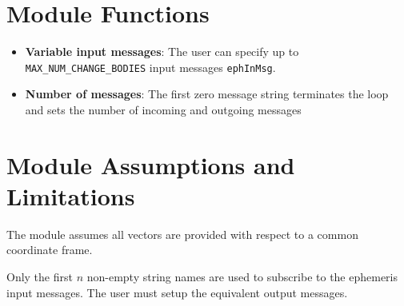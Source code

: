 

\section{Module Functions}
\begin{itemize}
	\item \textbf{Variable input messages}: The user can specify up to {\tt MAX\_NUM\_CHANGE\_BODIES} input messages {\tt ephInMsg}.
	\item \textbf{Number of messages}: The first zero message string terminates the loop and sets the number of incoming and outgoing messages
\end{itemize}

\section{Module Assumptions and Limitations}
The module assumes all vectors are provided with respect to a common coordinate frame.  

Only the first $n$ non-empty string names are used to subscribe to the ephemeris input messages.  The user must setup the equivalent output messages.  